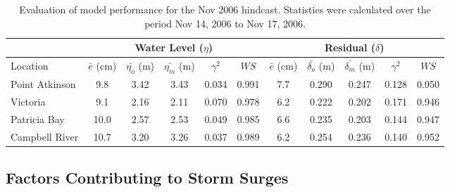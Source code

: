 \documentclass[pdftex,10pt]{article}
\begin{document}
\begin{table}[h]
\centering 
\begin{tabular}{|l |c c c c c | c c c c c|} 
\hline 
& \multicolumn{5}{|c|}{Water Level ($\eta$)}        & \multicolumn{5}{|c|}{Residual ($\delta$)} \\ 
\hline 
Location       & $\bar{e}$ (cm) & $\bar{\eta_{o}}$ (m) & $\bar{\eta_{m}}$ (m) & $\gamma^2$ & $WS$   & $\bar{e}$ (cm) & $\bar{\delta_{o}}$ (m) & $\bar{\delta_{m}}$ (m) & $\gamma^2$ & $WS$ \\
\hline 
Point Atkinson &  9.8           &  3.42                & 3.43                 &   0.034    & 0.991  &  7.7           &  0.290                 & 0.247                  &  0.128     & 0.950 \\
Victoria       &  9.1           &  2.16                & 2.11                 &   0.070    & 0.978  &  6.2           &  0.222                 & 0.202                  &  0.171     & 0.946 \\
Patricia Bay   & 10.0           &  2.57                & 2.53                 &   0.049    & 0.985  &  6.6           &  0.235                 & 0.203                  &  0.144     & 0.947 \\
Campbell River & 10.7           &  3.20                & 3.26                 &   0.037    & 0.989  &  6.2           &  0.254                 & 0.236                  &  0.140     & 0.952 \\
\hline 
\end{tabular}
\caption{Evaluation of model performance for the Nov 2006 hindcast. Statistics were calculated over the period Nov 14, 2006 to Nov 17, 2006.}
\label{tab:nov2006stat} 
\end{table}

\subsection{Factors Contributing to Storm Surges}
\end{document}
